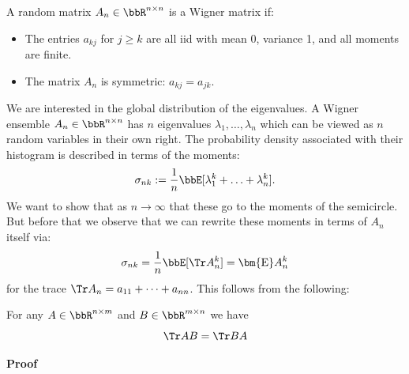 \begin{definition}[Wigner] A random matrix $A_n \ensuremath{\in} \ensuremath{\bbR}^{n \ensuremath{\times} n}$ is a Wigner matrix if:

\begin{itemize}
\item[1. ] The entries $a_{kj}$ for $j \ensuremath{\geq} k$ are all iid with mean 0, variance 1, and all moments are finite.


\item[2. ] The matrix $A_n$ is symmetric: $a_{kj} = a_{jk}$.

\end{itemize}
\end{definition}

We are interested in the global distribution of the eigenvalues. A Wigner ensemble $A_n \ensuremath{\in} \ensuremath{\bbR}^{n \ensuremath{\times} n}$ has $n$ eigenvalues $\ensuremath{\lambda}_1, \ensuremath{\ldots}, \ensuremath{\lambda}_n$ which can be viewed as $n$ random variables in their own right. The probability density associated with their histogram is described in terms of the moments:
\[
\ensuremath{\sigma}_{nk} := {1 \over n} \ensuremath{\bbE}[\ensuremath{\lambda}_1^k + \ensuremath{\ldots} + \ensuremath{\lambda}_n^k].
\]
We want to show that as $n \ensuremath{\rightarrow} \ensuremath{\infty}$ that these go to the moments of the semicircle. But before that we observe that we can rewrite these moments in terms of $A_n$ itself via:
\[
\ensuremath{\sigma}_{nk} = {1 \over n} \ensuremath{\bbE}[\Tr A_n^k] = \ensuremath{\bm{\mathrm{E}}} A_n^k
\]
for the trace $\Tr A_n = a_{11} + \ensuremath{\cdots} + a_{nn}$.  This follows from the following:

\begin{proposition} For any $A \ensuremath{\in} \ensuremath{\bbR}^{n \ensuremath{\times} m}$ and $B \ensuremath{\in} \ensuremath{\bbR}^{m \ensuremath{\times} n}$ we have
\[
\Tr A B = \Tr B A
\]
\end{proposition}
\textbf{Proof}

